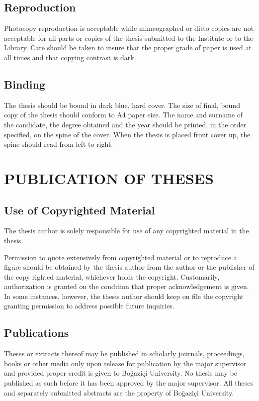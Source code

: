 \documentclass[a4paper,oneside,12pt]{report}
\numberwithin{equation}{chapter}
\begin{document}
\section{Reproduction}
Photocopy reproduction is acceptable while mimeographed or ditto
copies are not acceptable for all parts or copies of the thesis
submitted to the Institute or to the Library. Care should be taken to
insure that the proper grade of paper is used at all times and that
copying contrast is dark.


\section{Binding}
The thesis should be bound in dark blue, hard cover. The size of final, bound
copy of the thesis should conform to A4 paper size. The name and surname of
the candidate, the degree obtained and the year should be
printed, in the order specified, on the spine of the cover. When the thesis
is placed front cover up, the spine should read from left to right.



\chapter{PUBLICATION OF THESES}


\section{Use of Copyrighted Material}
The thesis author is solely responsible for use of any
copyrighted material in the thesis. 

Permission to quote extensively from copyrighted material or to
reproduce a figure should be obtained by the thesis author from the author 
or the publisher of the copy righted material, whichever holds the copyright. Customarily,
authorization is granted on the condition that proper acknowledgement
is given. In some instances, however, the thesis author should keep on file the copyright granting permission to address possible future inquiries.


\section{Publications}
Theses or extracts thereof may be published in scholarly journals, proceedings, books or other media only upon release for publication by the major supervisor and provided proper credit is
given to Bo\u{g}azi\c{c}i University. No thesis may be published as
such before it has been approved by the major supervisor. All theses
and separately submitted abstracts are the property of Bo\u{g}azi\c{c}i
University.
\end{document}
